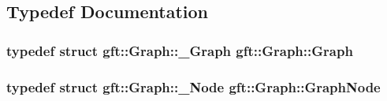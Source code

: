 \subsection{Typedef Documentation}
\hypertarget{namespacegft_1_1Graph_a95acabdf6e7f5b884255558bef5d3f8b}{
\subsubsection[{Graph}]{\setlength{\rightskip}{0pt plus 5cm}typedef struct {\bf gft\-::\-Graph\-::\-\_\-\-Graph}  {\bf gft\-::\-Graph\-::\-Graph}}}\label{namespacegft_1_1Graph_a95acabdf6e7f5b884255558bef5d3f8b}
\hypertarget{namespacegft_1_1Graph_a86c9c9e21a6c7f4770150ec13209cd89}{
\subsubsection[{Graph\-Node}]{\setlength{\rightskip}{0pt plus 5cm}typedef struct {\bf gft\-::\-Graph\-::\-\_\-\-Node}  {\bf gft\-::\-Graph\-::\-Graph\-Node}}}\label{namespacegft_1_1Graph_a86c9c9e21a6c7f4770150ec13209cd89}


